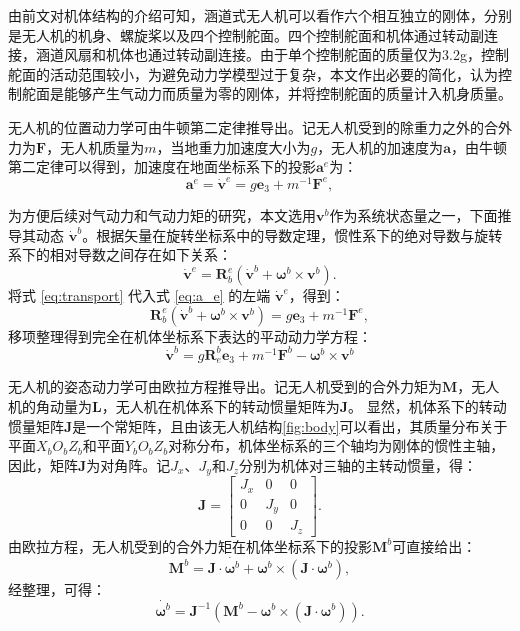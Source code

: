 由前文对机体结构的介绍可知，涵道式无人机可以看作六个相互独立的刚体，分别是无人机的机身、螺旋桨以及四个控制舵面。四个控制舵面和机体通过转动副连接，涵道风扇和机体也通过转动副连接。由于单个控制舵面的质量仅为3.2g，控制舵面的活动范围较小，为避免动力学模型过于复杂，本文作出必要的简化，认为控制舵面是能够产生气动力而质量为零的刚体，并将控制舵面的质量计入机身质量。

无人机的位置动力学可由牛顿第二定律推导出。记无人机受到的除重力之外的合外力为$\bm{F}$，无人机质量为$m$，当地重力加速度大小为$g$，无人机的加速度为$\bm{a}$，由牛顿第二定律可以得到，加速度在地面坐标系下的投影$\bm{a}^e$为：
\begin{equation}
    \bm{a}^e = \dot{\bm{v}}^e = g\bm{e}_{3} + m^{-1} \bm{F}^e,
    \label{eq:a_e}
\end{equation}

为方便后续对气动力和气动力矩的研究，本文选用$\bm{v}^b$作为系统状态量之一，下面推导其动态 $\dot{\bm{v}}^b$。根据矢量在旋转坐标系中的导数定理，惯性系下的绝对导数与旋转系下的相对导数之间存在如下关系：
\begin{equation}
    \dot{\bm{v}}^e = \bm{R}_b^e(\dot{\bm{v}}^b + \bm{\omega}^{b} \times \bm{v}^b).
    \label{eq:transport}
\end{equation}
将式 \eqref{eq:transport} 代入式 \eqref{eq:a_e} 的左端 $\dot{\bm{v}}^e$，得到：
\begin{equation}
    \bm{R}_b^e(\dot{\bm{v}}^b + \bm{\omega}^{b} \times \bm{v}^b) = g\bm{e}_{3} + m^{-1} \bm{F}^e,
\end{equation}
移项整理得到完全在机体坐标系下表达的平动动力学方程：
\begin{equation}
    \dot{\bm{v}}^b = g\bm{R}_e^b\bm{e}_3 + m^{-1} \bm{F}^b - \bm{\omega}^b \times \bm{v}^b
    \label{eq:d_vel}
\end{equation}

无人机的姿态动力学可由欧拉方程推导出。记无人机受到的合外力矩为$\bm{M}$，无人机的角动量为$\bm{L}$，无人机在机体系下的转动惯量矩阵为$\bm{J}$。
显然，机体系下的转动惯量矩阵$\bm{J}$是一个常矩阵，且由该无人机结构\ref{fig:body}可以看出，其质量分布关于平面$X_b O_b Z_b$和平面$Y_b O_b Z_b$对称分布，机体坐标系的三个轴均为刚体的惯性主轴，因此，矩阵$\bm{J}$为对角阵\cite{quan2018}。记$J_x$、$J_y$和$J_z$分别为机体对三轴的主转动惯量，得：
\begin{equation}
    \bm{J} = 
    \begin{bmatrix}
        J_x & 0 & 0 \\
        0 & J_y & 0 \\
        0 & 0 & J_z
    \end{bmatrix}.
\end{equation}
由欧拉方程，无人机受到的合外力矩在机体坐标系下的投影$\bm{M}^b$可直接给出：
\begin{equation}
    \bm{M}^b = \bm{J}\cdot\dot{\bm{\omega}^b}+\bm{\omega}^b\times(\bm{J}\cdot\bm{\omega}^b),
\end{equation}
经整理，可得：
\begin{equation}
    \dot{\bm{\omega}^b} = \bm{J}^{-1}(\bm{M}^b - \bm{\omega}^b\times(\bm{J}\cdot\bm{\omega}^b)).
    \label{eq:d_omega}
\end{equation}

